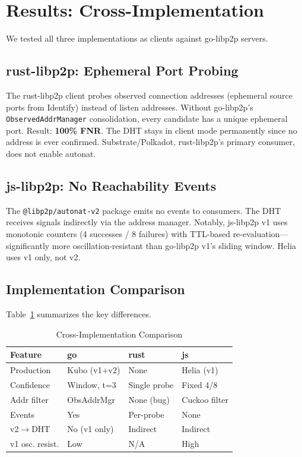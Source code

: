 \documentclass[conference]{IEEEtran}
\begin{document}
\section{Results: Cross-Implementation}

We tested all three implementations as clients against go-libp2p servers.

\subsection{rust-libp2p: Ephemeral Port Probing}

The rust-libp2p client probes observed connection addresses (ephemeral source ports from Identify) instead of listen addresses. Without go-libp2p's \texttt{ObservedAddrManager} consolidation, every candidate has a unique ephemeral port. Result: \textbf{100\% FNR}. The DHT stays in client mode permanently since no address is ever confirmed. Substrate/Polkadot, rust-libp2p's primary consumer, does not enable autonat.

\subsection{js-libp2p: No Reachability Events}

The \texttt{@libp2p/autonat-v2} package emits no events to consumers. The DHT receives signals indirectly via the address manager. Notably, js-libp2p v1 uses monotonic counters (4 successes / 8 failures) with TTL-based re-evaluation---significantly more oscillation-resistant than go-libp2p v1's sliding window. Helia uses v1 only, not v2.

\subsection{Implementation Comparison}

Table~\ref{tab:cross-impl} summarizes the key differences.

\begin{table}[htbp]
\caption{Cross-Implementation Comparison}
\label{tab:cross-impl}
\centering
\small
\begin{tabular}{@{}llll@{}}
\toprule
Feature & go & rust & js \\
\midrule
Production & Kubo (v1+v2) & None & Helia (v1) \\
Confidence & Window, t=3 & Single probe & Fixed 4/8 \\
Addr filter & ObsAddrMgr & None (bug) & Cuckoo filter \\
Events & Yes & Per-probe & None \\
v2$\rightarrow$DHT & No (v1 only) & Indirect & Indirect \\
v1 osc. resist. & Low & N/A & High \\
\bottomrule
\end{tabular}
\end{table}
\end{document}
